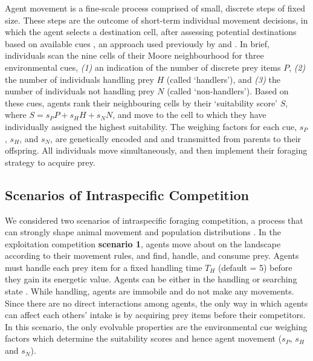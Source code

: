 Agent movement is a fine-scale process comprised of small, discrete steps of fixed size.
These steps are the outcome of short-term individual movement decisions, in which the agent selects a destination cell, after assessing potential destinations based on available cues \citep[similar to step selection or resource selection][]{fortin2005,manly2007}, an approach used previously by \cite{getz2015} and \cite{white2018}.
In brief, individuals scan the nine cells of their Moore neighbourhood for three environmental cues, \textit{(1)} an indication of the number of discrete prey items $P$, \textit{(2)} the number of individuals handling prey $H$ (called `handlers'), and \textit{(3)} the number of individuals not handling prey $N$ (called `non-handlers').
Based on these cues, agents rank their neighbouring cells by their `suitability score' $S$, where $S = s_PP + s_HH + s_NN$, and move to the cell to which they have individually assigned the highest suitability.
The weighing factors for each cue, $s_P$, $s_H$, and $s_N$, are genetically encoded and and transmitted from parents to their offspring.
All individuals move simultaneously, and then implement their foraging strategy to acquire prey.

\subsection*{Scenarios of Intraspecific Competition}

We considered two scenarios of intraspecific foraging competition, a process that can strongly shape animal movement and population distributions \citep{fretwell1970,parker1978}.
In the exploitation competition \textbf{scenario 1}, agents move about on the landscape according to their movement rules, and find, handle, and consume prey.
Agents must handle each prey item for a fixed handling time $T_H$ (default = 5) before they gain its energetic value.
Agents can be either in the handling or searching state \citep{holmgren1995}.
While handling, agents are immobile and do not make any movements.
Since there are no direct interactions among agents, the only way in which agents can affect each others' intake is by acquiring prey items before their competitors.
In this scenario, the only evolvable properties are the environmental cue weighing factors which determine the suitability scores and hence agent movement ($s_P$, $s_H$ and $s_N$).

